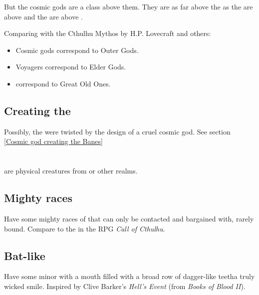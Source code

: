 But the cosmic gods are a class above them. They are as far above the \xss{} as the \xss{} are above \dragons{} and the \dragons{} are above \scathae. 

Comparing with the Cthulhu Mythos by H.P. Lovecraft and others:

\begin{itemize}
  \item Cosmic gods correspond to Outer Gods.
  \item Voyagers correspond to Elder Gods. 
  \item \XzaiShanns{} correspond to Great Old Ones. 
\end{itemize}








\subsection{Creating the \banes}
Possibly, the \banes{} were twisted by the design of a cruel cosmic god. See section \ref{Cosmic god creating the Banes}


















\section{\Daemons}
\index{\daemon}
\Pdaemons{} are physical creatures from \Machai{} or other \chaotic{} realms. 





\subsection{Mighty \daemonic{} races}
Have some mighty races of \daemons{} that can only be contacted and bargained with, rarely bound. Compare to the  in the RPG \emph{Call of Cthulhu}. 





\subsection{Bat-like \daemon}
Have some minor \pdaemons{} with a mouth filled with a broad row of dagger-like teeth\dash a truly wicked smile. Inspired by Clive Barker's \emph{Hell's Event} (from \emph{Books of Blood II}). 


